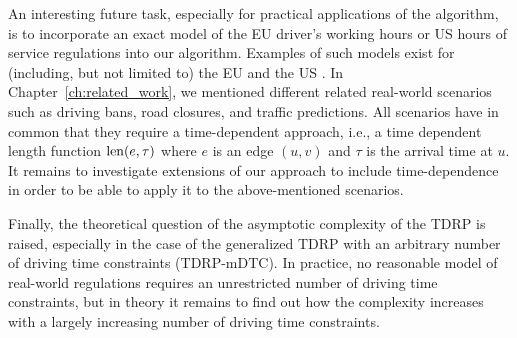 An interesting future task, especially for practical applications of the algorithm, is to incorporate an exact model of the EU driver's working hours or US hours of service regulations into our algorithm. Examples of such models exist for (including, but not limited to) the EU \cite{goel:2009a} and the US \cite{goel:2012c}. In Chapter~\ref{ch:related_work}, we mentioned different related real-world scenarios such as driving bans, road closures, and traffic predictions. All scenarios have in common that they require a time-dependent approach, i.e., a time dependent length function $\operatorname{len}(e,\tau)$ where $e$ is an edge $(u,v)$ and $\tau$ is the arrival time at $u$. It remains to investigate extensions of our approach to include time-dependence in order to be able to apply it to the above-mentioned scenarios.

Finally, the theoretical question of the asymptotic complexity of the TDRP is raised, especially in the case of the generalized TDRP with an arbitrary number of driving time constraints (TDRP-mDTC). In practice, no reasonable model of real-world regulations requires an unrestricted number of driving time constraints, but in theory it remains to find out how the complexity increases with a largely increasing number of driving time constraints.


